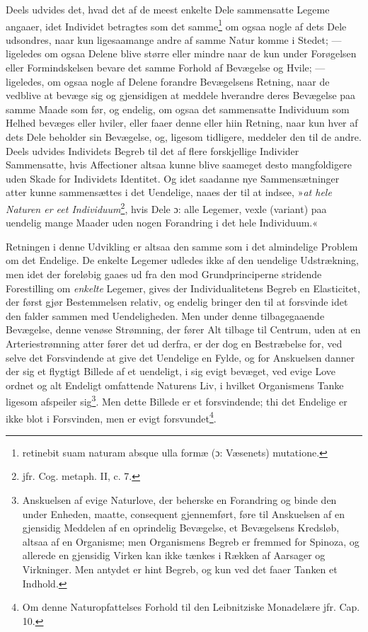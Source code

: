\documentclass[12pt,a4paper]{book}
\newcommand{\opage}[1]{\marginnote{\footnotesize\textit{[#1]}}}
\begin{document}
Deels udvides det, hvad det af de meest enkelte Dele sammensatte
Legeme angaaer, idet Individet betragtes som det
samme\footnote{retinebit suam naturam absque ulla formæ (ɔ:
Væsenets) mutatione.} om ogsaa nogle af dets Dele udsondres, naar
kun ligesaamange andre af samme Natur komme i Stedet; --- ligeledes
om ogsaa Delene blive større eller mindre naar de kun under
Forøgelsen eller Formindskelsen bevare det samme Forhold af
Bevægelse og Hvile; --- ligeledes, om ogsaa nogle af Delene forandre
Bevægelsens Retning, naar de vedblive at bevæge sig og
gjensidigen at meddele hverandre deres Bevægelse paa samme Maade
som før, og endelig, om ogsaa det sammensatte Individuum som
Helhed bevæges eller hviler, eller faaer denne eller hiin
Retning, naar kun hver af dets Dele beholder sin Bevægelse, og,
ligesom tidligere, meddeler den til de andre. Deels udvides
Individets Begreb til det af flere forskjellige Individer
Sammensatte, hvis Affectioner altsaa kunne blive saameget desto
mangfoldigere uden Skade for Individets Identitet. Og idet
saadanne nye Sammensætninger atter kunne sammensættes i det
Uendelige, naaes der til at indsee, »\emph{at hele Naturen er eet
Individuum}\footnote{jfr. Cog. metaph. II, c. 7.}, hvis Dele ɔ:
alle Legemer, vexle (variant) paa uendelig mange Maader uden
nogen Forandring i det hele Individuum.«

Retningen i denne Udvikling er altsaa den samme som i det
almindelige Problem om det Endelige. De enkelte Legemer udledes
ikke af den uendelige Udstrækning, men
\opage{81} \setcounter{footnote}{0}%
idet der foreløbig gaaes ud fra den mod Grundprinciperne
stridende Forestilling om \emph{enkelte} Legemer, gives der
Individualitetens Begreb en Elasticitet, der først gjør
Bestemmelsen relativ, og endelig bringer den til at forsvinde
idet den falder sammen med Uendeligheden. Men under denne
tilbagegaaende Bevægelse, denne venøse Strømning, der fører Alt
tilbage til Centrum, uden at en Arteriestrømning atter fører det
ud derfra, er der dog en Bestræbelse for, ved selve det
Forsvindende at give det Uendelige en Fylde, og for Anskuelsen
danner der sig et flygtigt Billede af et uendeligt, i sig evigt
bevæget, ved evige Love ordnet og alt Endeligt omfattende
Naturens Liv, i hvilket Organismens Tanke ligesom afspeiler
sig\footnote{Anskuelsen af evige Naturlove, der beherske en
Forandring og binde den under Enheden, maatte, consequent
gjennemført, føre til Anskuelsen af en gjensidig Meddelen af en
oprindelig Bevægelse, et Bevægelsens Kredsløb, altsaa af en
Organisme; men Organismens Begreb er fremmed for Spinoza, og
allerede en gjensidig Virken kan ikke tænkes i Rækken af
Aarsager og Virkninger. Men antydet er hint Begreb, og kun ved
det faaer Tanken et Indhold.}. Men dette Billede er et
forsvindende; thi det Endelige er ikke blot i Forsvinden, men er
evigt forsvundet\footnote{Om denne Naturopfattelses Forhold til
den Leibnitziske Monadelære jfr. Cap. 10.}.
\end{document}
